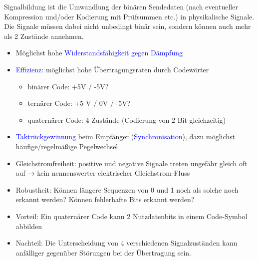 
Signalbildung ist die Umwandlung der binären Sendedaten (nach eventueller Kompression und/oder Kodierung mit Prüfsummen etc.) in physikalische Signale.
Die Signale müssen dabei nicht unbedingt binär sein, sondern können auch mehr als 2 Zustände annehmen.

\begin{itemize}
    \item Möglichst hohe \textcolor{blue}{Widerstandsfähigkeit gegen Dämpfung}
    \item \textcolor{blue}{Effizienz:} möglichst hohe Übertragungsraten durch Codewörter
    \begin{itemize}
        \item binärer Code: +5V / -5V?
        \item ternärer Code: +5 V / 0V / -5V?
        \item quaternärer Code: 4 Zustände (Codierung von 2 Bit gleichzeitig)
    \end{itemize}
    \item \textcolor{blue}{Taktrückgewinnung} beim Empfänger (\textcolor{blue}{Synchronisation}), dazu möglichst
    häufige/regelmäßige Pegelwechsel
    \item Gleichstromfreiheit: positive und negative Signale treten ungefähr gleich oft auf → kein nennenswerter elektrischer Gleichstrom-Fluss
    \item Robustheit: Können längere Sequenzen von 0 und 1 noch als solche noch erkannt werden?
    Können fehlerhafte Bits erkannt werden?
\end{itemize}

\begin{itemize}
    \item Vorteil: Ein quaternärer Code kann 2 Nutzdatenbits in einem Code-Symbol abbilden
    \item Nachteil: Die Unterscheidung von 4 verschiedenen Signalzuständen kann anfälliger gegenüber Störungen bei der Übertragung sein.
\end{itemize}

